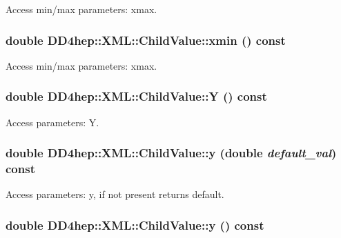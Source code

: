 Access min/max parameters: xmax. \hypertarget{struct_d_d4hep_1_1_x_m_l_1_1_child_value_ad7adca8ba6e98179eb8265ad2dfa8e5d}{
\subsubsection[{xmin}]{\setlength{\rightskip}{0pt plus 5cm}double DD4hep::XML::ChildValue::xmin () const}}
\label{struct_d_d4hep_1_1_x_m_l_1_1_child_value_ad7adca8ba6e98179eb8265ad2dfa8e5d}


Access min/max parameters: xmax. \hypertarget{struct_d_d4hep_1_1_x_m_l_1_1_child_value_a167c3504adc36f2cadc97b1e7f539962}{
\subsubsection[{Y}]{\setlength{\rightskip}{0pt plus 5cm}double DD4hep::XML::ChildValue::Y () const}}
\label{struct_d_d4hep_1_1_x_m_l_1_1_child_value_a167c3504adc36f2cadc97b1e7f539962}


Access parameters: Y. \hypertarget{struct_d_d4hep_1_1_x_m_l_1_1_child_value_a877c2405e3f03ed4a58333b003bb1f9a}{
\subsubsection[{y}]{\setlength{\rightskip}{0pt plus 5cm}double DD4hep::XML::ChildValue::y (double {\em default\_\-val}) const}}
\label{struct_d_d4hep_1_1_x_m_l_1_1_child_value_a877c2405e3f03ed4a58333b003bb1f9a}


Access parameters: y, if not present returns default. \hypertarget{struct_d_d4hep_1_1_x_m_l_1_1_child_value_a7f599ff4a314d4ec1b92b50b0561cb46}{
\subsubsection[{y}]{\setlength{\rightskip}{0pt plus 5cm}double DD4hep::XML::ChildValue::y () const}}
\label{struct_d_d4hep_1_1_x_m_l_1_1_child_value_a7f599ff4a314d4ec1b92b50b0561cb46}


